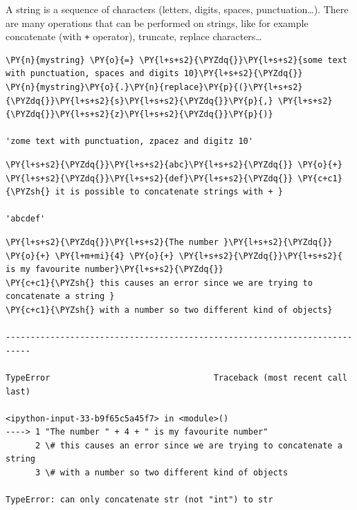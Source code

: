 A string is a sequence of characters (letters, digits, spaces, punctuation\ldots). There are many operations that can be performed on strings, like for example concatenate (with \texttt{+} operator), truncate, replace characters\ldots

\begin{tcolorbox}[breakable, size=fbox, boxrule=1pt, pad at break*=1mm, colback=cellbackground, colframe=cellborder]            
\begin{Verbatim}[commandchars=\\\{\}]
\PY{n}{mystring} \PY{o}{=} \PY{l+s+s2}{\PYZdq{}}\PY{l+s+s2}{some text with punctuation, spaces and digits 10}\PY{l+s+s2}{\PYZdq{}}
\PY{n}{mystring}\PY{o}{.}\PY{n}{replace}\PY{p}{(}\PY{l+s+s2}{\PYZdq{}}\PY{l+s+s2}{s}\PY{l+s+s2}{\PYZdq{}}\PY{p}{,} \PY{l+s+s2}{\PYZdq{}}\PY{l+s+s2}{z}\PY{l+s+s2}{\PYZdq{}}\PY{p}{)}

'zome text with punctuation, zpacez and digitz 10'
\end{Verbatim}
\end{tcolorbox}

\begin{tcolorbox}[breakable, size=fbox, boxrule=1pt, pad at break*=1mm, colback=cellbackground, colframe=cellborder]            
\begin{Verbatim}[commandchars=\\\{\}]
\PY{l+s+s2}{\PYZdq{}}\PY{l+s+s2}{abc}\PY{l+s+s2}{\PYZdq{}} \PY{o}{+} \PY{l+s+s2}{\PYZdq{}}\PY{l+s+s2}{def}\PY{l+s+s2}{\PYZdq{}} \PY{c+c1}{\PYZsh{} it is possible to concatenate strings with + }

'abcdef'
\end{Verbatim}
\end{tcolorbox}

\begin{tcolorbox}[breakable, size=fbox, boxrule=1pt, pad at break*=1mm, colback=cellbackground, colframe=cellborder]            
\begin{Verbatim}[commandchars=\\\{\}]
\PY{l+s+s2}{\PYZdq{}}\PY{l+s+s2}{The number }\PY{l+s+s2}{\PYZdq{}} \PY{o}{+} \PY{l+m+mi}{4} \PY{o}{+} \PY{l+s+s2}{\PYZdq{}}\PY{l+s+s2}{ is my favourite number}\PY{l+s+s2}{\PYZdq{}}
\PY{c+c1}{\PYZsh{} this causes an error since we are trying to concatenate a string }
\PY{c+c1}{\PYZsh{} with a number so two different kind of objects}

---------------------------------------------------------------------------

TypeError                                 Traceback (most recent call last)

<ipython-input-33-b9f65c5a45f7> in <module>()
----> 1 "The number " + 4 + " is my favourite number"
      2 \# this causes an error since we are trying to concatenate a string
      3 \# with a number so two different kind of objects

TypeError: can only concatenate str (not "int") to str
\end{Verbatim}
\end{tcolorbox}

